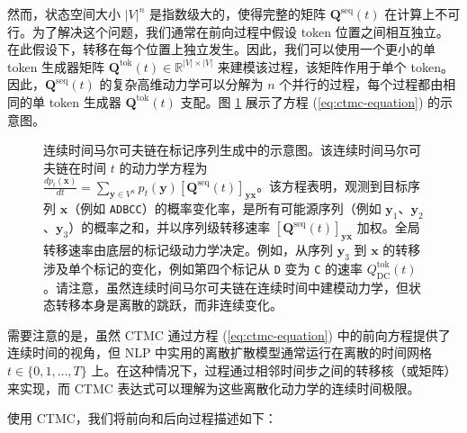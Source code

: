 \documentclass[UTF8,a4paper,zihao=-4,oneside,openany]{ctexbook}
\makeatletter
\newcommand{\AMLFigure}[2][0.96\linewidth]{%
  \begingroup
  \let\AtBeginDocument\@gobble
  \endgroup
}
\makeatother
\begin{document}
然而，状态空间大小 $|V|^n$ 是指数级大的，使得完整的矩阵 $\mathbf{Q}^{\mathrm{seq}}(t)$ 在计算上不可行。为了解决这个问题，我们通常在前向过程中假设 token 位置之间相互独立。在此假设下，转移在每个位置上独立发生。因此，我们可以使用一个更小的单 token 生成器矩阵 $\mathbf{Q}^{\mathrm{tok}}(t) \in \mathbb{R}^{|V| \times |V|}$ 来建模该过程，该矩阵作用于单个 token。因此，$\mathbf{Q}^{\mathrm{seq}}(t)$ 的复杂高维动力学可以分解为 $n$ 个并行的过程，每个过程都由相同的单 token 生成器 $\mathbf{Q}^{\mathrm{tok}}(t)$ 支配。图 \ref{fig:ctmc-for-sequence-generation} 展示了方程 (\ref{eq:ctmc-equation}) 的示意图。

\begin{figure}[!t]
\centering
\AMLFigure{figure-ctmc-for-sequence-generation}
\caption{连续时间马尔可夫链在标记序列生成中的示意图。该连续时间马尔可夫链在时间 $t$ 的动力学方程为 $\frac{d p_t(\mathbf{x})}{dt} = \sum_{\mathbf{y} \in V^n} p_t(\mathbf{y}) [\mathbf{Q}^{\mathrm{seq}}(t)]_{\mathbf{y}\mathbf{x}}$。该方程表明，观测到目标序列 $\mathbf{x}$（例如 \texttt{ADBCC}）的概率变化率，是所有可能源序列（例如 $\mathbf{y}_1$、$\mathbf{y}_2$、$\mathbf{y}_3$）的概率之和，并以序列级转移速率 $[\mathbf{Q}^{\mathrm{seq}}(t)]_{\mathbf{y}\mathbf{x}}$ 加权。全局转移速率由底层的标记级动力学决定。例如，从序列 $\mathbf{y}_3$ 到 $\mathbf{x}$ 的转移涉及单个标记的变化，例如第四个标记从 \texttt{D} 变为 \texttt{C} 的速率 $Q^{\mathrm{tok}}_{\mathrm{DC}}(t)$。请注意，虽然连续时间马尔可夫链在连续时间中建模动力学，但状态转移本身是离散的跳跃，而非连续变化。}
\label{fig:ctmc-for-sequence-generation}
\end{figure}

需要注意的是，虽然 CTMC 通过方程 (\ref{eq:ctmc-equation}) 中的前向方程提供了连续时间的视角，但 NLP 中实用的离散扩散模型通常运行在离散的时间网格 $t \in \{0,1,\dots,T\}$ 上。在这种情况下，过程通过相邻时间步之间的转移核（或矩阵）来实现，而 CTMC 表达式可以理解为这些离散化动力学的连续时间极限。

使用 CTMC，我们将前向和后向过程描述如下：
\end{document}
